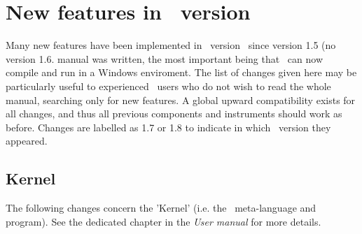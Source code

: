 
\chapter{New features in \MCS\ version \version\ }
\label{c:changes}

Many new features have been implemented in \MCS\ version \version\  since
version 1.5 (no version 1.6. manual was written, the most important being that
\MCS\ can now compile and run in a Windows enviroment.  The list of changes
given here may be particularly  useful to experienced \MCS\ users who do not
wish to read the whole  manual, searching only for new features. A global
upward compatibility  exists for all changes, and thus all previous components
and  instruments should work as before. Changes are labelled as 1.7 or 1.8 to 
indicate in which \MCS\ version they appeared. 

\section{Kernel} 
\label{s:new-features:kernel}

The following changes concern the 'Kernel' (i.e. the \MCS\ meta-language and program). See the dedicated chapter in the {\it User manual} for more details.

